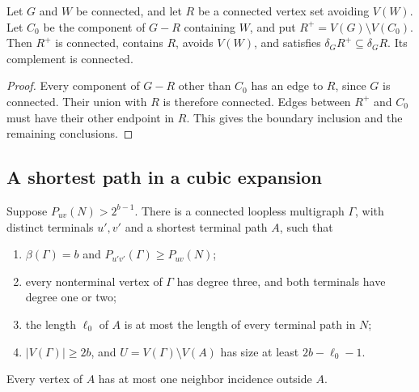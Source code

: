 \begin{lemma}\label{lem:general-shore-closure}
Let $G$ and $W$ be connected, and let $R$ be a connected vertex set avoiding $V(W)$.
Let $C_0$ be the component of $G-R$ containing $W$, and put $R^+=V(G)\setminus V(C_0)$.
Then $R^+$ is connected, contains $R$, avoids $V(W)$, and satisfies
$\delta_G R^+\subseteq\delta_G R$.
Its complement is connected.
\end{lemma}

\begin{proof}
Every component of $G-R$ other than $C_0$ has an edge to $R$, since $G$ is connected.
Their union with $R$ is therefore connected.
Edges between $R^+$ and $C_0$ must have their other endpoint in $R$.
This gives the boundary inclusion and the remaining conclusions.
\end{proof}

\subsection{A shortest path in a cubic expansion}

\begin{lemma}\label{lem:general-shortest-reduction}
Suppose $P_{uv}(N)>2^{b-1}$.
There is a connected loopless multigraph $\Gamma$, with distinct terminals $u',v'$ and a shortest terminal path $A$, such that
\begin{enumerate}
\item $\beta(\Gamma)=b$ and $P_{u'v'}(\Gamma)\ge P_{uv}(N)$;
\item every nonterminal vertex of $\Gamma$ has degree three, and both terminals have degree one or two;
\item the length $\ell_0$ of $A$ is at most the length of every terminal path in $N$;
\item $|V(\Gamma)|\ge2b$, and $U=V(\Gamma)\setminus V(A)$ has size at least $2b-\ell_0-1$.
\end{enumerate}
Every vertex of $A$ has at most one neighbor incidence outside $A$.
\end{lemma}

